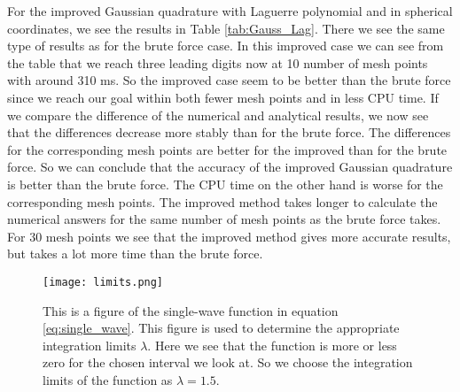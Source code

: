 \documentclass[12pt,a4paper,english]{article}
\begin{document}
For the improved Gaussian quadrature with Laguerre polynomial and in spherical coordinates, we see the results in Table \ref{tab:Gauss_Lag}. There we see the same type of results as for the brute force case. In this improved case we can see from the table that we reach three leading digits now at 10 number of mesh points with around 310 ms. So the improved case seem to be better than the brute force since we reach our goal within both fewer mesh points and in less CPU time. If we compare the difference of the numerical and analytical results, we now see that the differences decrease more stably than for the brute force. The differences for the corresponding mesh points are better for the improved than for the brute force. So we can conclude that the accuracy of the improved Gaussian quadrature is better than the brute force. The CPU time on the other hand is worse for the corresponding mesh points. The improved method takes longer to calculate the numerical answers for the same number of mesh points as the brute force takes. For 30 mesh points we see that the improved method gives more accurate results, but takes a lot more time than the brute force.

\begin{figure}[htbp]
	\centering\texttt{[image: limits.png]}
	\caption{This is a figure of the single-wave function in equation \ref{eq:single_wave}. This figure is used to determine the appropriate integration limits $\lambda$. Here we see that the function is more or less zero for the chosen interval we look at. So we choose the integration limits of the function as $\lambda=1.5$. \label{fig:limits}}
\end{figure}
\end{document}

